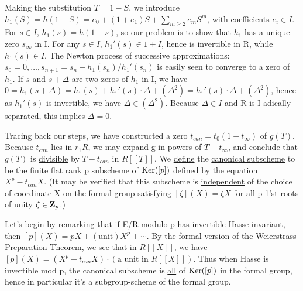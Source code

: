 \begin{kaproof}
Making the substitution $T = 1-S$, we introduce
$h_1(S) = h(1-S) = e_0 + (1+e_1)S + \sum_{m\geq 2} e_m S^m$, with coefficients
$e_i\in I$. For $s\in I$, $h_1(s) = h(1-s)$, so our problem is to show that
$h_1$ has a unique zero $s_\infty$ in I. For any $s\in I$, $h_1'(s)\in 1+I$,
hence is invertible in R, while $h_1(s)\in I$. The Newton process of successive
approximations: $s_0 = 0,\dots,s_{n+1} = s_n - h_1(s_n)/h_1'(s_n)$ is easily
seen to converge to a zero of $h_1$. If $s$ and $s+\Delta$ are \uline{two}
zeros of $h_1$ in I, we have
$0 = h_1(s+\Delta) = h_1(s) + h_1'(s)\cdot\Delta + (\Delta^2) = h_1'(s)\cdot
\Delta + (\Delta^2)$, hence as $h_1'(s)$ is invertible, we have
$\Delta\in(\Delta^2)$. Because $\Delta\in I$ and R is I-adically separated,
this implies $\Delta = 0$.
\end{kaproof}

Tracing back our steps, we have constructed a zero $t_{can} = t_0(1 - t_\infty)$
of $g(T)$. Because $t_{can}$ lies in $r_1 R$, we may expand g in powers of
$T-t_\infty$, and conclude that $g(T)$ is \uline{divisible} by $T-t_{can}$ in
$R[[T]]$. We \uline{define} the \uline{canonical subscheme} to be the finite
flat rank p subscheme of $\operatorname{Ker}([p])$ defined by the equation $X^p - t_{can}X$.
(It may be verified that this subscheme is \uline{independent} of the choice of
coordinate X on the formal group satisfying $[\zeta](X) = \zeta X$ for all
p-1'st roots of unity $\zeta\in\mathbf{Z}_p$.)


Let's begin by remarking that if E/R modulo p has \uline{invertible} Hasse
invariant, then $[p](X) = pX + (\text{unit})X^p + \cdots$. By the formal version
of the Weierstrass Preparation Theorem, we see that in $R[[X]]$, we have
$[p](X) = (X^p - t_{can}X)\cdot(\text{a unit in } R[[X]])$. Thus when Hasse is
invertible mod p, the canonical subscheme is \uline{all} of $\operatorname{Ker}([p])$ in the
formal group, hence in particular it's a subgroup-scheme of the formal group.


